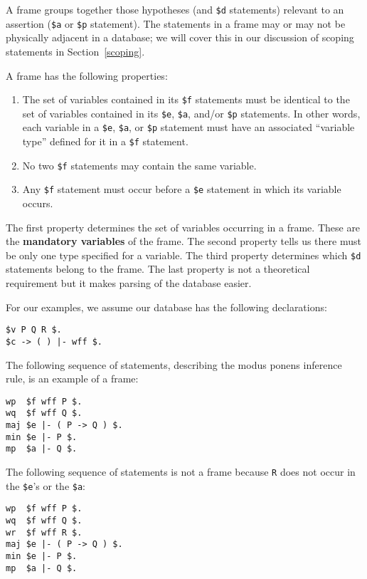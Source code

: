 A frame groups together those hypotheses (and \texttt{\$d} statements) relevant
to an assertion (\texttt{\$a} or \texttt{\$p} statement).  The statements in a frame
may or may not be physically adjacent in a database; we will cover
this in our discussion of scoping statements
in Section~\ref{scoping}.

A frame has the following properties:
\begin{enumerate}
 \item The set of variables contained in its \texttt{\$f} statements must
be identical to the set of variables contained in its \texttt{\$e},
\texttt{\$a}, and/or \texttt{\$p} statements.  In other words, each
variable in a \texttt{\$e}, \texttt{\$a}, or \texttt{\$p} statement must
have an associated ``variable type'' defined for it in a \texttt{\$f}
statement.
  \item No two \texttt{\$f} statements may contain the same variable.
  \item Any \texttt{\$f} statement
must occur before a \texttt{\$e} statement in which its variable occurs.
\end{enumerate}

The first property determines the set of variables occurring in a frame.
These are the {\bf mandatory
variables} of the frame.  The second property
tells us there must be only one type specified for a variable.  The
third property determines which \texttt{\$d} statements belong to the
frame.  The last property is not a theoretical requirement but it
makes parsing of the database easier.

For our examples, we assume our database has the following declarations:

\begin{verbatim}
$v P Q R $.
$c -> ( ) |- wff $.
\end{verbatim}

The following sequence of statements, describing the modus ponens inference
rule, is an example of a frame:

\begin{verbatim}
wp  $f wff P $.
wq  $f wff Q $.
maj $e |- ( P -> Q ) $.
min $e |- P $.
mp  $a |- Q $.
\end{verbatim}

The following sequence of statements is not a frame because \texttt{R} does not
occur in the \texttt{\$e}'s or the \texttt{\$a}:

\begin{verbatim}
wp  $f wff P $.
wq  $f wff Q $.
wr  $f wff R $.
maj $e |- ( P -> Q ) $.
min $e |- P $.
mp  $a |- Q $.
\end{verbatim}

